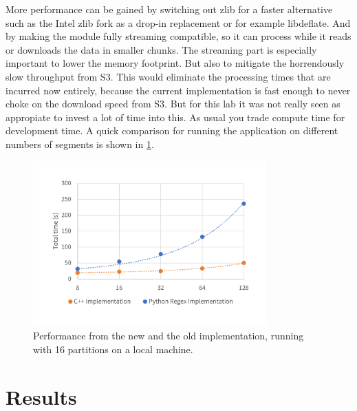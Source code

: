 \documentclass{article}
\begin{document}
More performance can be gained by switching out zlib for a faster alternative such as the Intel zlib fork as a drop-in replacement or for example libdeflate.
And by making the module fully streaming compatible, so it can process while it reads or downloads the data in smaller chunks.
The streaming part is especially important to lower the memory footprint.
But also to mitigate the horrendously slow throughput from S3.
This would eliminate the processing times that are incurred now entirely, because the current implementation is fast enough to never choke on the download speed from S3.
But for this lab it was not really seen as appropiate to invest a lot of time into this.
As usual you trade compute time for development time.
A quick comparison for running the application on different numbers of segments is shown in \cref{fig:impl-scaling}.

\begin{figure}[H]
    \centering
    \includegraphics[width=0.8\textwidth]{resource/impl-scaling.pdf}
    \caption{Performance from the new and the old implementation, running with 16 partitions on a local machine.}
    \label{fig:impl-scaling}
\end{figure}

\section{Results}


\printbibliography
\end{document}
